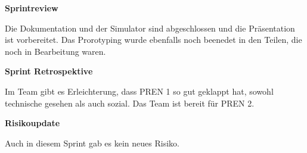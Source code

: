 \textbf{Sprintreview}

Die Dokumentation und der Simulator sind abgeschlossen und die Präsentation ist vorbereitet. Das Prorotyping wurde ebenfalls noch beenedet in den Teilen, die noch in Bearbeitung waren.

\textbf{Sprint Retrospektive}

Im Team gibt es Erleichterung, dass PREN 1 so gut geklappt hat, sowohl technische gesehen als auch sozial. Das Team ist bereit für PREN 2.

\textbf{Risikoupdate}

Auch in diesem Sprint gab es kein neues Risiko.

